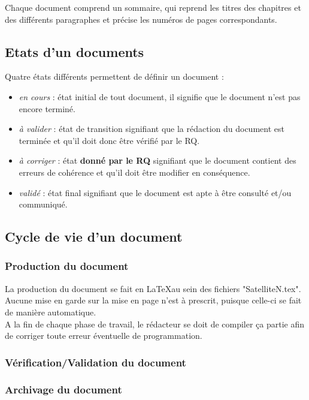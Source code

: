       Chaque document comprend un sommaire, qui reprend les titres des chapitres et des différents paragraphes et précise les numéros de pages correspondants.
  
   
  \subsection{Etats d'un documents}
  
    Quatre états différents permettent de définir un document :
    \begin{itemize}
      \item \textit{en cours} : état initial de tout document, il signifie que le document n'est pas encore terminé.
      \item \textit{à valider} : état de transition signifiant que la rédaction du document est terminée et qu'il doit donc être vérifié par le RQ.
      \item \textit{à corriger} : état \textbf{donné par le RQ} signifiant que le document contient des erreurs de cohérence et qu'il doit être modifier en conséquence.
      \item \textit{validé} : état final signifiant que le document est apte à être consulté et/ou communiqué.
    \end{itemize}
  
  \subsection{Cycle de vie d'un document}
    \subsubsection{Production du document}
      La production du document se fait en \LaTeX au sein des fichiers "SatelliteN.tex".\\ Aucune mise en garde sur la mise en page n'est à
      prescrit, puisque celle-ci se fait de manière automatique.\\ A la fin de chaque phase de travail, le rédacteur se doit de compiler ça partie
      afin de corriger toute erreur éventuelle de programmation.
    \subsubsection{Vérification/Validation du document}
    \subsubsection{Archivage du document}

